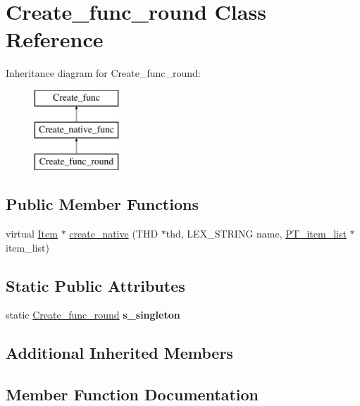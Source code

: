 \hypertarget{classCreate__func__round}{}\section{Create\+\_\+func\+\_\+round Class Reference}
\label{classCreate__func__round}
Inheritance diagram for Create\+\_\+func\+\_\+round\+:\begin{figure}[H]
\begin{center}
\leavevmode
\includegraphics[height=3.000000cm]{classCreate__func__round}
\end{center}
\end{figure}
\subsection*{Public Member Functions}
\begin{DoxyCompactItemize}
\item 
virtual \mbox{\hyperlink{classItem}{Item}} $\ast$ \mbox{\hyperlink{classCreate__func__round_a7a7236f725259e58247056aa553d5c3a}{create\+\_\+native}} (T\+HD $\ast$thd, L\+E\+X\+\_\+\+S\+T\+R\+I\+NG name, \mbox{\hyperlink{classPT__item__list}{P\+T\+\_\+item\+\_\+list}} $\ast$item\+\_\+list)
\end{DoxyCompactItemize}
\subsection*{Static Public Attributes}
\begin{DoxyCompactItemize}
\item 
\mbox{\label{classCreate__func__round_a2f77c4dafd1056ec73f09f6b10b893be}} 
static \mbox{\hyperlink{classCreate__func__round}{Create\+\_\+func\+\_\+round}} {\bfseries s\+\_\+singleton}
\end{DoxyCompactItemize}
\subsection*{Additional Inherited Members}


\subsection{Member Function Documentation}
\mbox{\label{classCreate__func__round_a7a7236f725259e58247056aa553d5c3a}} 
